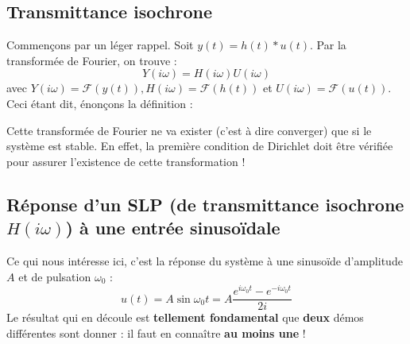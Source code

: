 	\subsection{Transmittance isochrone}
	Commençons par un léger rappel. Soit $y(t) = h(t)*u(t)$. Par la transformée de Fourier, 
	on trouve : 
	\begin{equation}
	Y(i\omega) = H(i\omega)U(i\omega)
	\end{equation}
	avec $Y(i\omega) = \mathcal{F}(y(t)), H(i\omega) = \mathcal{F}(h(t))$ et $U(i\omega) = 
	\mathcal{F}(u(t))$.\\
	Ceci étant dit, énonçons la définition :\\

	
	Cette transformée de Fourier ne va exister (c'est à dire converger) que si le système 
	est stable. En effet, la première condition de Dirichlet doit être  vérifiée pour 
	assurer l'existence de cette transformation !


	\subsection{Réponse d'un SLP (de transmittance isochrone $H(i\omega)$) à une entrée
	sinusoïdale}
	Ce qui nous intéresse ici, c'est la réponse du système à une sinusoïde d'amplitude 
	$A$ et de pulsation $\omega_0$ :
	\begin{equation}
	u(t) = A\sin\omega_0t = A \dfrac{e^{i\omega_0t}-e^{-i\omega_0t}}{2i}
	\label{eq:EntreA}
	\end{equation}
	Le résultat qui en découle est \textbf{tellement fondamental} que \textbf{deux} démos
	différentes sont donner : il faut en connaître \textbf{au moins une} ! 
	

